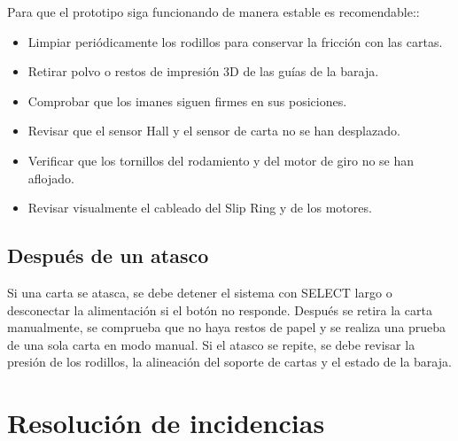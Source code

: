 \documentclass[a4paper, 11pt]{article}
\begin{document}
Para que el prototipo siga funcionando de manera estable es recomendable::

\begin{itemize}
    \item Limpiar periódicamente los rodillos para conservar la fricción con las cartas.
    \item Retirar polvo o restos de impresión 3D de las guías de la baraja.
    \item Comprobar que los imanes siguen firmes en sus posiciones.
    \item Revisar que el sensor Hall y el sensor de carta no se han desplazado.
    \item Verificar que los tornillos del rodamiento y del motor de giro no se han aflojado.
    \item Revisar visualmente el cableado del Slip Ring y de los motores.
\end{itemize}

\subsection{Después de un atasco}

Si una carta se atasca, se debe detener el sistema con SELECT largo o desconectar la alimentación si el botón no responde. Después se retira la carta manualmente, se comprueba que no haya restos de papel y se realiza una prueba de una sola carta en modo manual. Si el atasco se repite, se debe revisar la presión de los rodillos, la alineación del soporte de cartas y el estado de la baraja.

\section{Resolución de incidencias}
\end{document}
